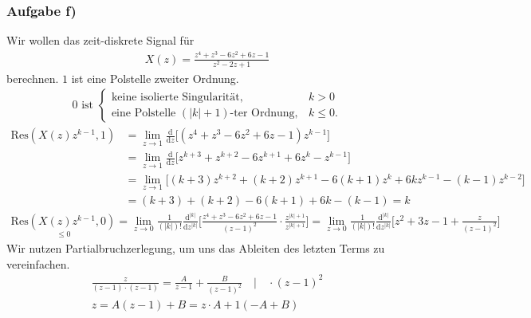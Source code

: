 \subsubsection{Aufgabe f)}
Wir wollen das zeit-diskrete Signal für
\begin{align}
	X(z)=\frac{z^4+z^3-6z^2+6z-1}{z^2-2z+1}
\end{align}
berechnen.
$1$ ist eine Polstelle zweiter Ordnung.
\begin{align}
	0\text{ ist }\begin{cases}
		\text{keine isolierte Singularität}, &k>0\\
		\text{eine Polstelle } (|k|+1)\text{-ter Ordnung}, &k\leq0.
	\end{cases}
\end{align}
\begin{align}
	\mathrm{Res}(X(z)z^{k-1},1)&=\lim\limits_{z\rightarrow1}\frac{\mathrm{d}}{\mathrm{d}z}\bigg [(z^4+z^3-6z^2+6z-1)z^{k-1}\bigg]\nonumber\\
	&=\lim\limits_{z\rightarrow1}\frac{\mathrm{d}}{\mathrm{d}z}\bigg[z^{k+3}+z^{k+2}-6z^{k+1}+6z^k-z^{k-1}\bigg]\nonumber\\
	&=\lim\limits_{z\rightarrow1}\bigg[(k+3)z^{k+2}+(k+2)z^{k+1}-6(k+1)z^{k}+6kz^{k-1}-(k-1)z^{k-2}\bigg ]\nonumber\\
	&=(k+3)+(k+2)-6(k+1)+6k-(k-1)=k
\end{align}
\begin{align}
	\underset{\leq0}{\mathrm{Res}(X(z)z^{k-1},0)}=\lim\limits_{z\rightarrow0}\frac{1}{(|k|)!}\frac{\mathrm{d}^{|k|}}{\mathrm{d}z^{|k|}}\Bigg[\frac{z^4+z^3-6z^2+6z-1}{(z-1)^2}\cdot\frac{z^{|k|+1}}{z^{|k|+1}}\Bigg]=\lim\limits_{z\rightarrow0}\frac{1}{(|k|)!}\frac{\mathrm{d}^{|k|}}{\mathrm{d}z^{|k|}}\Bigg[z^2+3z-1+\frac{z}{(z-1)^2}\Bigg]
\end{align}
Wir nutzen Partialbruchzerlegung, um uns das Ableiten des letzten Terms zu vereinfachen.
\begin{align}
	\frac{z}{(z-1)\cdot(z-1)}=\frac{A}{z-1}+\frac{B}{(z-1)^2}\quad\Bigg | \quad \cdot(z-1)^2\nonumber\\
	z=A(z-1)+B=z\cdot A+1(-A+B)
\end{align}
